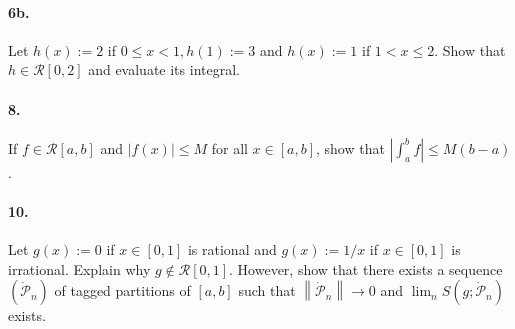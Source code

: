 \documentclass[12pt]{article}
\theoremstyle{remark}
\begin{document}
\paragraph{6b.} Let $h(x):=2$ if $0 \leq x<1, h(1):=3$ and $h(x):=1$ if $1<x \leq 2$. Show that $h \in \mathcal{R}[0,2]$ and evaluate its integral.

\paragraph{8.} If $f \in \mathcal{R}[a, b]$ and $|f(x)| \leq M$ for all $x \in[a, b]$, show that $\left|\int_a^b f\right| \leq M(b-a)$.

\paragraph{10.} Let $g(x):=0$ if $x \in[0,1]$ is rational and $g(x):=1 / x$ if $x \in[0,1]$ is irrational. Explain why $g \notin \mathcal{R}[0,1]$. However, show that there exists a sequence $\left(\dot{\mathcal{P}}_n\right)$ of tagged partitions of $[a, b]$ such that $\left\|\dot{\mathcal{P}}_n\right\| \rightarrow 0$ and $\lim _n S\left(g ; \dot{\mathcal{P}}_n\right)$ exists.
\end{document}
